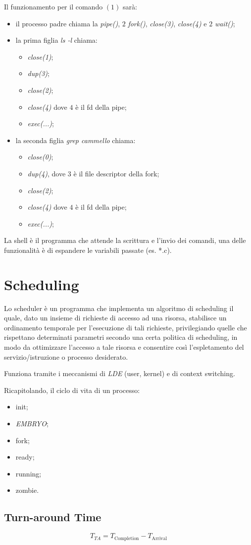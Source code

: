 Il funzionamento per il  comando $(1)$ sarà:
\begin{itemize}
  \item il processo padre chiama la \textit{pipe()}, $2$ \textit{fork()},
    \textit{close(3)}, \textit{close(4)} e $2$ \textit{wait()};
  \item la prima figlia \textit{ls -l} chiama:
    \begin{itemize}
      \item \textit{close(1)};
      \item \textit{dup(3)};
      \item \textit{close(2)};
      \item \textit{close(4)} dove $4$ è il fd della pipe;
      \item \textit{exec(...)};
    \end{itemize}
  \item la seconda figlia \textit{grep cammello} chiama:
    \begin{itemize}
      \item \textit{close(0)};
      \item \textit{dup(4)}, dove $3$ è il file descriptor della fork;
      \item \textit{close(2)};
      \item \textit{close(4)} dove $4$ è il fd della pipe;
      \item \textit{exec(...)};
    \end{itemize}
\end{itemize}

La shell è il programma che attende la scrittura e l'invio dei comandi, una
delle funzionalità è di espandere le variabili passate (es. *.c).

\section{Scheduling}
Lo scheduler è un programma che implementa un algoritmo di scheduling il quale,
dato un insieme di richieste di accesso ad una risorsa, stabilisce un
ordinamento temporale per l'esecuzione di tali richieste, privilegiando quelle
che rispettano determinati parametri secondo una certa politica di scheduling,
in modo da ottimizzare l'accesso a tale risorsa e consentire così
l'espletamento del servizio/istruzione o processo desiderato.

Funziona tramite i meccanismi di \emph{LDE} (user, kernel) e di context
switching.

Ricapitolando, il ciclo di vita di un processo:
\begin{itemize}
  \item init;
  \item \emph{EMBRYO};
  \item fork;
  \item ready;
  \item running;
  \item zombie.
\end{itemize}

\subsection{Turn-around Time}
\[
  T_{TA}=T_{ \text{Completion}}-T_{ \text{Arrival}}
\]
